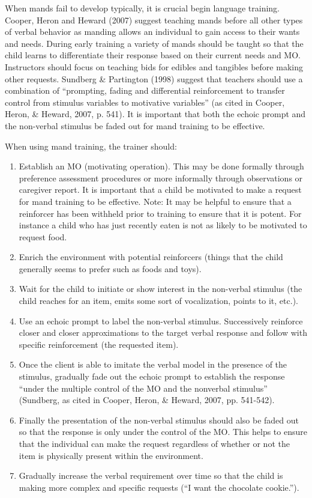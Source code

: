 When mands fail to develop typically, it is crucial begin language training.   Cooper, Heron and Heward (2007) suggest teaching mands before all other types of verbal behavior as manding allows an individual to gain access to their wants and needs. During early training a variety of mands should be taught so that the child learns to differentiate their response based on their current needs and MO. Instructors should focus on teaching bids for edibles and tangibles before making other requests.   Sundberg \& Partington (1998) suggest that teachers should use a combination of ``prompting, fading and differential reinforcement to transfer control from stimulus variables to motivative variables'' (as cited in Cooper, Heron, \& Heward, 2007, p. 541).  It is important that both the echoic prompt and the non-verbal stimulus be faded out for mand training to be effective.  

When using mand training, the trainer should:
\begin{enumerate}
\item Establish an MO (motivating operation).  This may be done formally through preference assessment procedures or more informally through observations or caregiver report.  It is important that a child be motivated to make a request for mand training to be effective.  Note: It may be helpful to ensure that a reinforcer has been withheld prior to training to ensure that it is potent.  For instance a child who has just recently eaten is not as likely to be motivated to request food.  
\item Enrich the environment with potential reinforcers (things that the child generally seems to prefer such as foods and toys).
\item Wait for the child to initiate or show interest in the non-verbal stimulus (the child reaches for an item, emits some sort of vocalization, points to it, etc.). 
\item Use an echoic prompt to label the non-verbal stimulus.  Successively reinforce closer and closer approximations to the target verbal response and follow with specific reinforcement (the requested item).  
\item Once the client is able to imitate the verbal model in the presence of the stimulus, gradually fade out the echoic prompt to establish the response ``under the multiple control of the MO and the nonverbal stimulus'' (Sundberg, as cited in Cooper, Heron, \& Heward, 2007, pp. 541-542).  
\item Finally the presentation of the non-verbal stimulus should also be faded out so that the response is only under the control of the MO.  This helps to ensure that the individual can make the request regardless of whether or not the item is physically present within the environment. 
\item Gradually increase the verbal requirement over time so that the child is making more complex and specific requests (``I want the chocolate cookie.'').
\end{enumerate}
%
